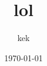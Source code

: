 \documentclass[aspectratio=169]{beamer}
\title{lol}
\author{kek}
\date{\today}
\begin{document}
\begin{frame}

\titlepage
    
\end{frame}
\end{document}
